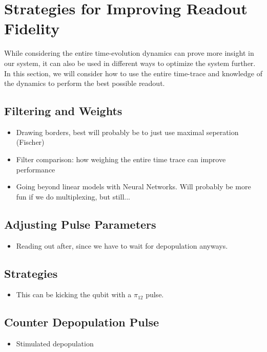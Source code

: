 \chapter{Strategies for Improving Readout Fidelity}
While considering the entire time-evolution dynamics can prove more insight in our system, it can also be used in different ways to optimize the system further. In this section, we will consider how to use the entire time-trace and knowledge of the dynamics to perform the best possible readout.

\section{Filtering and Weights}
\begin{itemize}
    \item Drawing borders, best will probably be to just use maximal seperation (Fischer)
    \item Filter comparison: how weighing the entire time trace can improve performance
    \item Going beyond linear models with Neural Networks. Will probably be more fun if we do multiplexing, but still... 
\end{itemize}

\section{Adjusting Pulse Parameters}
\begin{itemize}
    \item Reading out after, since we have to wait for depopulation anyways.
\end{itemize}

\section{Strategies}
\begin{itemize}
    \item This can be kicking the qubit with a $\pi_{12}$ pulse. 
\end{itemize}

\section{Counter Depopulation Pulse}
\begin{itemize}
    \item Stimulated depopulation
\end{itemize}


